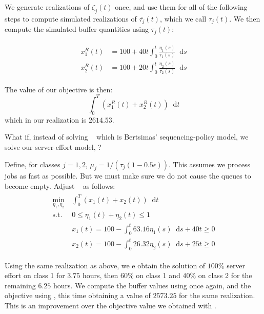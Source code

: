 \documentclass[11pt,a4paper,titlepage]{article}
\newcommand*{\dd}{\ensuremath{\mathop{}\!\mathrm{d}}}%
\theoremstyle{definition}
\theoremstyle{plain}
\begin{document}
    We generate realizations of $\zeta_j(t)$ once,
    and use them for all of the following steps
    to compute simulated realizations of $\bar{\tau_j}(t)$,
    which we call $\tau_j(t)$.
    We then compute the simulated buffer quantities using $\tau_j(t)$:

    \begin{align}
        \label{eq:buffer-robust-realization}
        \begin{split}
            x_1^R (t) &= 100 + 40 t \int_0^t \frac{\eta_1(s)}{\tau_1(s)} \dd s \\
            x_2^R (t) &= 100 + 20 t \int_0^t \frac{\eta_2(s)}{\tau_2(s)} \dd s
        \end{split}
    \end{align}

    The value of our objective is then:
    \begin{equation}
        \label{eq:cost-robust-realization}
        \int_0^T \left( x_1^R(t) + x_2^R(t) \right) \dd t
    \end{equation}
    which in our realization is $2614.53$.

    What if,
    instead of solving \modeltwo~ which is Bertsimas' sequencing-policy model,
    we solve our server-effort model,
    \modelone?

    Define,
    for classes $j=1,2$,
    $\mu_j=1/(\tau_j ( 1 - 0.5 \epsilon))$.
    This assumes we process jobs as fast as possible.
    But we must make sure we do not cause the queues to become empty.
    Adjust \modelone~ as follows:
    \begin{align}
        \label{eq:model-1-robust}
        \begin{split}
            \min\limits_{\eta_1, \eta_2}
            &~ \int_0^T \left( x_1(t) + x_2(t) \right) \dd t \\
            \text{s.t.}
            &~ 0 \leq \eta_1(t) + \eta_2(t) \leq 1 \\
            &~ x_1(t) = 100 - \int_0^t 63.16 \eta_1(s) \dd s + 40t \geq 0 \\
            &~ x_2(t) = 100 - \int_0^t 26.32 \eta_2(s) \dd s + 25t \geq 0
        \end{split}
    \end{align}

    Using the same realization as above,
    we e obtain the solution of $100\%$
    server effort on class 1 for $3.75$ hours,
    then $60\%$ on class 1 and $40\%$
    on class 2 for the remaining $6.25$ hours.
    We compute the buffer values using  once again,
    and the objective using ,
    this time obtaining a value of $2573.25$ for the same realization.
    This is an improvement over the objective value we obtained with \modelone.
\end{document}
